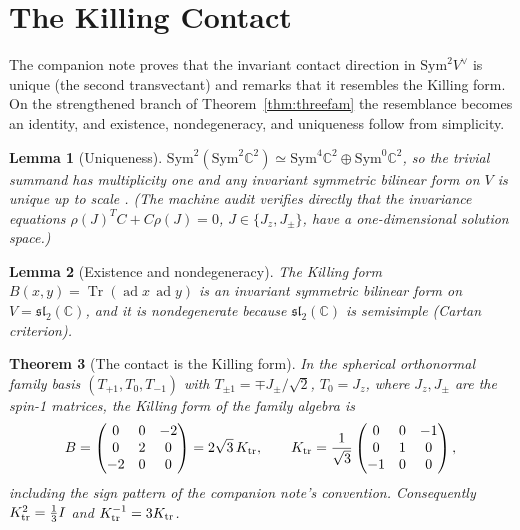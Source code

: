 \documentclass[
  aps,
  prd,
  preprint,
  nofootinbib,
  superscriptaddress,
  longbibliography
]{revtex4-2}
\newcommand{\sltwo}{\mathfrak{sl}_2(\mathbb C)}
\DeclareMathOperator{\Tr}{Tr}
\DeclareMathOperator{\ad}{ad}
\newtheorem{theorem}{Theorem}[section]
\newtheorem{lemma}[theorem]{Lemma}
\begin{document}
\section{The Killing Contact}
\label{sec:killing}

The companion note proves that the invariant contact direction in
\(\mathrm{Sym}^2V^\vee\) is unique (the second transvectant) and remarks
that it resembles the Killing form.  On the strengthened branch of
Theorem~\ref{thm:threefam} the resemblance becomes an identity, and
existence, nondegeneracy, and uniqueness follow from simplicity.

\begin{lemma}[Uniqueness]
\label{lem:unique}
\(\mathrm{Sym}^2(\mathrm{Sym}^2\mathbb C^2)
\simeq\mathrm{Sym}^4\mathbb C^2\oplus\mathrm{Sym}^0\mathbb C^2\), so the
trivial summand has multiplicity one and any invariant symmetric bilinear
form on \(V\) is unique up to scale \cite{FultonHarris1991}.  (The machine
audit verifies directly that the invariance equations
\(\rho(J)^TC+C\rho(J)=0\), \(J\in\{J_z,J_\pm\}\), have a one-dimensional
solution space.)
\end{lemma}

\begin{lemma}[Existence and nondegeneracy]
\label{lem:cartan-exist}
The Killing form \(B(x,y)=\Tr(\ad x\,\ad y)\) is an invariant symmetric
bilinear form on \(V=\sltwo\), and it is nondegenerate because \(\sltwo\)
is semisimple (Cartan criterion).
\end{lemma}

\begin{theorem}[The contact is the Killing form]
\label{thm:killing}
In the spherical orthonormal family basis
\((T_{+1},T_0,T_{-1})\) with \(T_{\pm1}=\mp J_\pm/\sqrt2\), \(T_0=J_z\),
where \(J_z,J_\pm\) are the spin-1 matrices, the Killing form of the family
algebra is
\[
  B=
  \begin{pmatrix}
    0&0&-2\\
    0&2&0\\
    -2&0&0
  \end{pmatrix}
  =2\sqrt3\,K_{\rm tr},
  \qquad
  K_{\rm tr}
  =\frac1{\sqrt3}
  \begin{pmatrix}
    0&0&-1\\
    0&1&0\\
    -1&0&0
  \end{pmatrix},
\]
including the sign pattern of the companion note's convention.
Consequently \(K_{\rm tr}^2=\tfrac13 I\) and \(K_{\rm tr}^{-1}=3K_{\rm tr}\).
\end{theorem}
\end{document}
